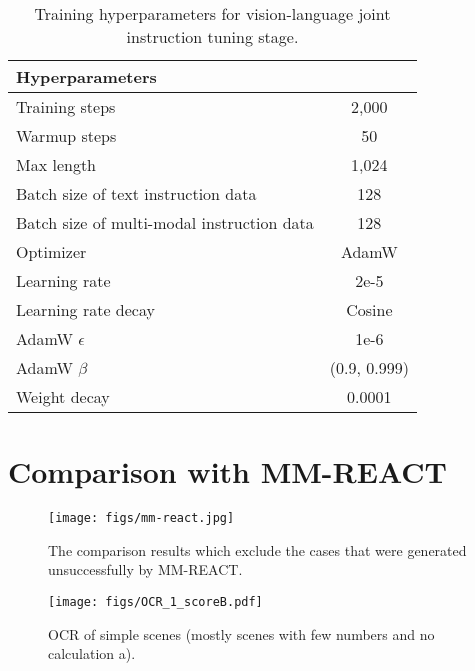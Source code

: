 \documentclass{article}
\begin{document}
\begin{table}[ht]
\centering
\begin{tabular}{lc}
\toprule
\textbf{Hyperparameters} & \\ \midrule
Training steps                   &       2,000 \\
Warmup steps                      &       50 \\
Max length         &       1,024 \\
Batch size of text instruction data  &       128 \\
Batch size of multi-modal instruction data  &   128 \\
Optimizer & AdamW \\
Learning rate & 2e-5 \\
Learning rate decay & Cosine \\
AdamW $\epsilon$ & 1e-6 \\
AdamW $\beta$ & (0.9, 0.999) \\
Weight decay & 0.0001 \\
\bottomrule
\end{tabular}
\vspace{1ex}
\caption{Training hyperparameters for vision-language joint instruction tuning stage.}
\label{tbl:hyperparam:ft}
\end{table}

\section{Comparison with MM-REACT}
\begin{figure}[!ht]
     \centering
     \texttt{[image: figs/mm-react.jpg]}
     \caption{The comparison results which exclude the cases that were generated unsuccessfully by MM-REACT.}
     \label{fig:mm-react}
     \vspace{-2mm}
\end{figure}




























\begin{figure}[!ht]
    \centering
    \texttt{[image: figs/OCR\_1\_scoreB.pdf]}
    \caption{OCR of simple scenes (mostly scenes with few numbers and no calculation a).}
    \label{fig:OCR_1_scoreB}
    \vspace{-2mm}
\end{figure}
\end{document}
